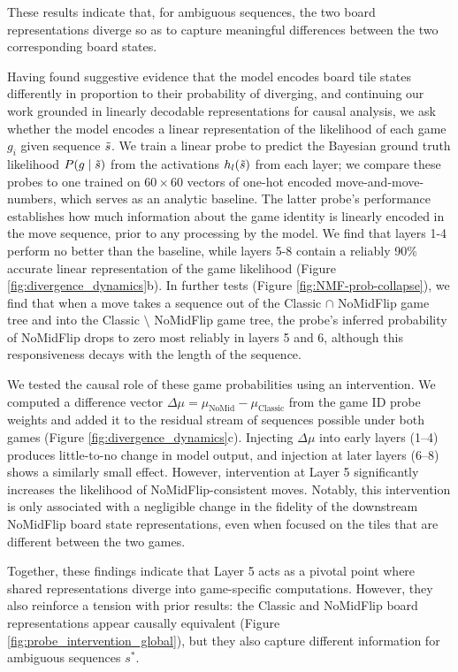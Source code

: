 \documentclass{article}
\theoremstyle{plain}
\theoremstyle{definition}
\theoremstyle{remark}
\begin{document}
These results indicate that, for ambiguous sequences, the two board representations diverge so as to capture meaningful differences between the two corresponding board states.

Having found suggestive evidence that the model encodes board tile states differently in proportion to their probability of diverging, and continuing our work grounded in linearly decodable representations for causal analysis, we ask whether the model encodes a linear representation of the likelihood of each game $g_i$ given sequence $\Tilde{s}$. We train a linear probe to predict the Bayesian ground truth likelihood $P(g \mid \Tilde{s})$ from the activations $h_l(\Tilde{s})$ from each layer; we compare these probes to one trained on $60 \times 60$ vectors of one-hot encoded move-and-move-numbers, which serves as an analytic baseline. The latter probe's performance establishes how much information about the game identity is linearly encoded in the move sequence, prior to any processing by the model. We find that layers 1-4 perform no better than the baseline, while layers 5-8 contain a reliably 90\% accurate linear representation of the game likelihood (Figure \ref{fig:divergence_dynamics}b). In further tests (Figure \ref{fig:NMF-prob-collapse}), we find that when a move takes a sequence out of the Classic $\cap$ NoMidFlip game tree and into the Classic $\setminus$ NoMidFlip game tree, the probe's inferred probability of NoMidFlip drops to zero most reliably in layers 5 and 6, although this responsiveness decays with the length of the sequence.

We tested the causal role of these game probabilities using an intervention. We computed a difference vector $\Delta \mu = \mu_{\text{NoMid}} - \mu_{\text{Classic}}$ from the game ID probe weights and added it to the residual stream of sequences possible under both games (Figure \ref{fig:divergence_dynamics}c). Injecting $\Delta \mu$ into early layers (1--4) produces little-to-no change in model output, and injection at later layers (6--8) shows a similarly small effect. However, intervention at Layer 5 significantly increases the likelihood of NoMidFlip-consistent moves. Notably, this intervention is only associated with a negligible change in the fidelity of the downstream NoMidFlip board state representations, even when focused on the tiles that are different between the two games.

Together, these findings indicate that Layer 5 acts as a pivotal point where shared representations diverge into game-specific computations. However, they also reinforce a tension with prior results: the Classic and NoMidFlip board representations appear causally equivalent (Figure \ref{fig:probe_intervention_global}), but they also capture different information for ambiguous sequences $s^*$.
\end{document}
